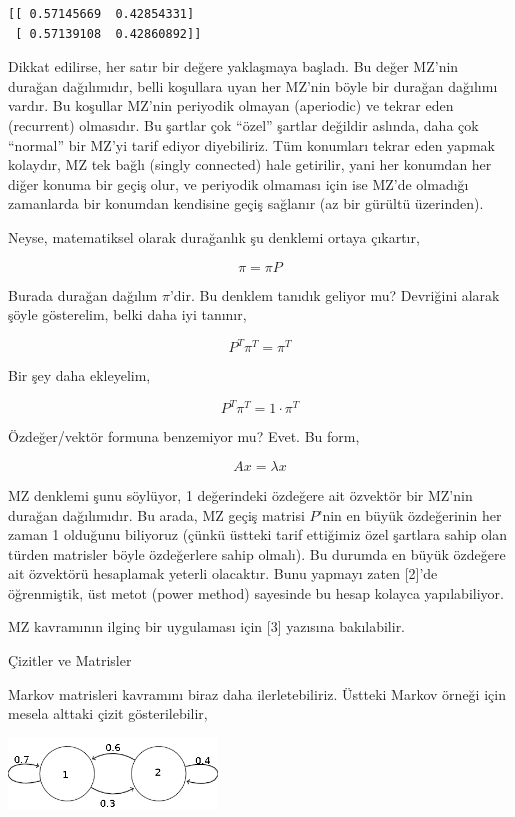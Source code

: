 \documentclass[12pt,fleqn]{article}\usepackage{../../common}
\begin{document}
\begin{verbatim}
[[ 0.57145669  0.42854331]
 [ 0.57139108  0.42860892]]
\end{verbatim}

Dikkat edilirse, her satır bir değere yaklaşmaya başladı. Bu değer MZ'nin
durağan dağılımıdır, belli koşullara uyan her MZ'nin böyle bir durağan dağılımı
vardır. Bu koşullar MZ'nin periyodik olmayan (aperiodic) ve tekrar eden
(recurrent) olmasıdır. Bu şartlar çok ``özel'' şartlar değildir aslında, daha
çok ``normal'' bir MZ'yi tarif ediyor diyebiliriz. Tüm konumları tekrar eden
yapmak kolaydır, MZ tek bağlı (singly connected) hale getirilir, yani her
konumdan her diğer konuma bir geçiş olur, ve periyodik olmaması için ise MZ'de
olmadığı zamanlarda bir konumdan kendisine geçiş sağlanır (az bir gürültü
üzerinden).

Neyse, matematiksel olarak durağanlık şu denklemi ortaya çıkartır,

$$ \pi = \pi P $$

Burada durağan dağılım $\pi$'dir. Bu denklem tanıdık geliyor mu?  Devriğini
alarak şöyle gösterelim, belki daha iyi tanınır, 

$$ P^T\pi^T = \pi^T $$

Bir şey daha ekleyelim, 

$$ P^T\pi^T = 1 \cdot \pi^T $$

Özdeğer/vektör formuna benzemiyor mu? Evet. Bu form,

$$ Ax = \lambda x $$

MZ denklemi şunu söylüyor, 1 değerindeki özdeğere ait özvektör bir MZ'nin
durağan dağılımıdır. Bu arada, MZ geçiş matrisi $P$'nin en büyük özdeğerinin her
zaman 1 olduğunu biliyoruz (çünkü üstteki tarif ettiğimiz özel şartlara sahip
olan türden matrisler böyle özdeğerlere sahip olmalı). Bu durumda en büyük
özdeğere ait özvektörü hesaplamak yeterli olacaktır. Bunu yapmayı zaten [2]'de
öğrenmiştik, üst metot (power method) sayesinde bu hesap kolayca yapılabiliyor.

MZ kavramının ilginç bir uygulaması için [3] yazısına bakılabilir.

Çizitler ve Matrisler

Markov matrisleri kavramını biraz daha ilerletebiliriz. Üstteki Markov örneği
için mesela alttaki çizit gösterilebilir,

\includegraphics[width=15em]{stat_093_mc_01.png}
\end{document}
